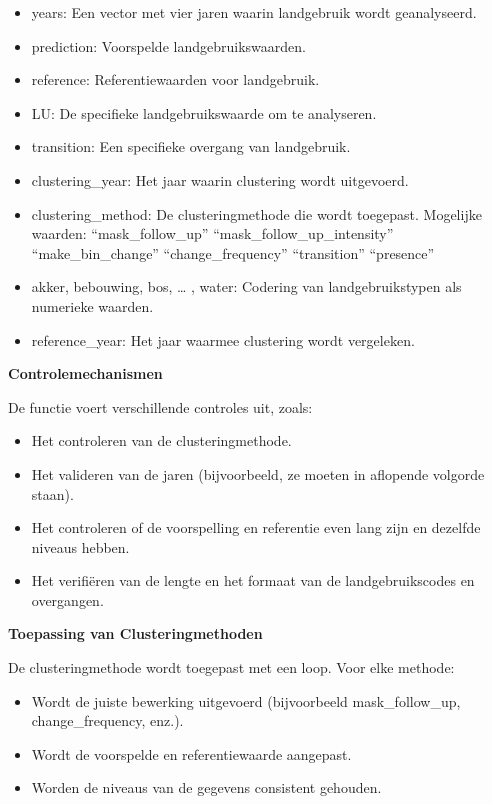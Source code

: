\documentclass[twoside]{extreport}
\providecommand{\tightlist}{%
  \setlength{\itemsep}{0pt}\setlength{\parskip}{0pt}}\usepackage{longtable,booktabs,array}
\begin{document}
\begin{itemize}
\tightlist
\item
  years: Een vector met vier jaren waarin landgebruik wordt
  geanalyseerd.
\item
  prediction: Voorspelde landgebruikswaarden.
\item
  reference: Referentiewaarden voor landgebruik.
\item
  LU: De specifieke landgebruikswaarde om te analyseren.
\item
  transition: Een specifieke overgang van landgebruik.
\item
  clustering\_year: Het jaar waarin clustering wordt uitgevoerd.
\item
  clustering\_method: De clusteringmethode die wordt toegepast.
  Mogelijke waarden: ``mask\_follow\_up''
  ``mask\_follow\_up\_intensity'' ``make\_bin\_change''
  ``change\_frequency'' ``transition'' ``presence''
\item
  akker, bebouwing, bos, \ldots{} , water: Codering van
  landgebruikstypen als numerieke waarden.
\item
  reference\_year: Het jaar waarmee clustering wordt vergeleken.
\end{itemize}

\textbf{Controlemechanismen}

De functie voert verschillende controles uit, zoals:

\begin{itemize}
\tightlist
\item
  Het controleren van de clusteringmethode.
\item
  Het valideren van de jaren (bijvoorbeeld, ze moeten in aflopende
  volgorde staan).
\item
  Het controleren of de voorspelling en referentie even lang zijn en
  dezelfde niveaus hebben.
\item
  Het verifiëren van de lengte en het formaat van de landgebruikscodes
  en overgangen.
\end{itemize}

\textbf{Toepassing van Clusteringmethoden}

De clusteringmethode wordt toegepast met een loop. Voor elke methode:

\begin{itemize}
\tightlist
\item
  Wordt de juiste bewerking uitgevoerd (bijvoorbeeld mask\_follow\_up,
  change\_frequency, enz.).
\item
  Wordt de voorspelde en referentiewaarde aangepast.
\item
  Worden de niveaus van de gegevens consistent gehouden.
\end{itemize}
\end{document}
